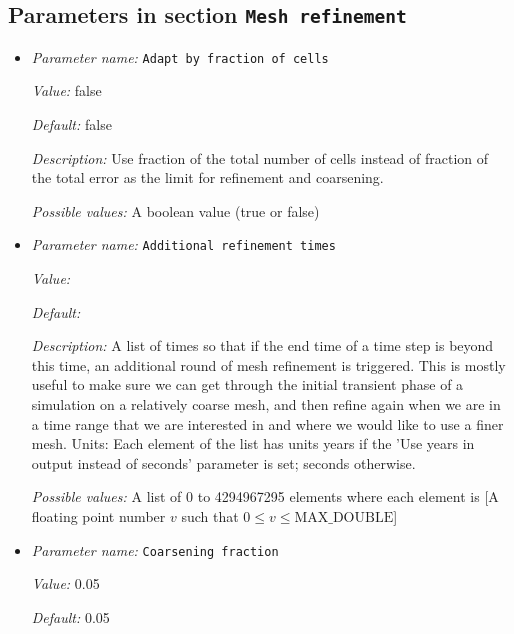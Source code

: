 \subsection{Parameters in section \tt Mesh refinement}
\label{parameters:Mesh_20refinement}

\begin{itemize}
\item {\it Parameter name:} {\tt Adapt by fraction of cells}
\label{parameters:Mesh refinement/Adapt by fraction of cells}


{\it Value:} false


{\it Default:} false


{\it Description:} Use fraction of the total number of cells instead of fraction of the total error as the limit for refinement and coarsening.


{\it Possible values:} A boolean value (true or false)
\item {\it Parameter name:} {\tt Additional refinement times}
\label{parameters:Mesh refinement/Additional refinement times}


{\it Value:} 


{\it Default:} 


{\it Description:} A list of times so that if the end time of a time step is beyond this time, an additional round of mesh refinement is triggered. This is mostly useful to make sure we can get through the initial transient phase of a simulation on a relatively coarse mesh, and then refine again when we are in a time range that we are interested in and where we would like to use a finer mesh. Units: Each element of the list has units years if the 'Use years in output instead of seconds' parameter is set; seconds otherwise.


{\it Possible values:} A list of 0 to 4294967295 elements where each element is [A floating point number $v$ such that $0 \leq v \leq \text{MAX\_DOUBLE}$]
\item {\it Parameter name:} {\tt Coarsening fraction}
\label{parameters:Mesh refinement/Coarsening fraction}


{\it Value:} 0.05


{\it Default:} 0.05



\end{itemize}
